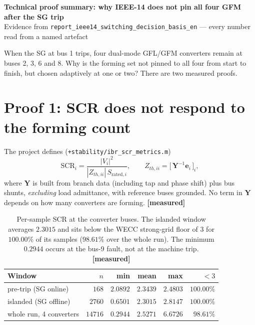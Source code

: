 \documentclass[11pt,a4paper]{article}
\newcommand{\code}[1]{\texttt{\small #1}}
\newcommand{\mes}{\textcolor{ok}{\textbf{[measured]}}}
\begin{document}
\begin{center}
{\large\bfseries\color{navy} Technical proof summary: why IEEE-14 does not pin all four GFM after the SG trip}\\[2pt]
{\small\color{gray} Evidence from \code{report\_ieee14\_switching\_decision\_basis\_en} --- every number read from a named artefact}
\end{center}

\vspace{-4pt}
\noindent
When the SG at bus 1 trips, four dual-mode GFL/GFM converters remain at buses
2, 3, 6 and 8. Why is the forming set not pinned to all four from start to finish,
but chosen adaptively at one or two? There are two measured proofs.

\section{Proof 1: SCR does not respond to the forming count}

\noindent
The project defines (\code{+stability/ibr\_scr\_metrics.m})
\begin{equation}
\mathrm{SCR}_i = \frac{|V_i|^2}{|Z_{th,ii}|\,S_{\mathrm{rated},i}},
\qquad
Z_{th,ii} = \bigl[\,\mathbf{Y}^{-1}\mathbf{e}_i\,\bigr]_i ,
\label{eq:scr}
\end{equation}
where $\mathbf{Y}$ is built from branch data (including tap and phase shift) plus
bus shunts, \emph{excluding} load admittance, with reference buses grounded. No
term in $\mathbf{Y}$ depends on how many converters are forming. \mes

\begin{table}[H]
\centering\small
\begin{tabular}{@{}lrrrrr@{}}
\toprule
\textbf{Window} & $n$ & \textbf{min} & \textbf{mean} & \textbf{max} & \textbf{$<3$}\\
\midrule
pre-trip (SG online)   & $168$   & $2.0892$ & $2.3439$ & $2.4803$ & $100.00\%$\\
islanded (SG offline)  & $2760$  & $0.6501$ & $\mathbf{2.3015}$ & $2.8147$ & $\mathbf{100.00\%}$\\
whole run, 4 converters & $14716$ & $0.2944$ & $2.5271$ & $6.6726$ & $\mathbf{98.61\%}$\\
\bottomrule
\end{tabular}
\caption{Per-sample SCR at the converter buses. The islanded window averages
$2.3015$ and sits below the WECC strong-grid floor of $3$ for $100.00\%$ of its
samples ($98.61\%$ over the whole run). The minimum $0.2944$ occurs at the bus-9
fault, not at the machine trip. \mes}
\end{table}
\end{document}
